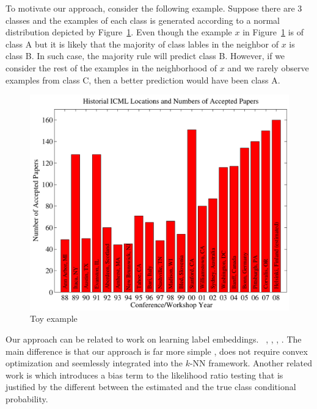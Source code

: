 \documentclass{article}
\begin{document}
To motivate our approach, consider the following example. Suppose
there are 3 classes and the examples of each class is generated
according to a normal distribution depicted by
Figure~\ref{fig:toy_example}. Even though the example $x$ in
Figure~\ref{fig:toy_example} is of class A but it is likely that the
majority of class lables in the neighbor of $x$ is class B. In such
case, the majority rule will predict class B. However, if we consider the rest
of the examples in the neighborhood of $x$ and we rarely observe
examples from class C, then a better prediction would have been class A.

\begin{figure}[ht]
\vskip 0.2in
\begin{center}
\centerline{\includegraphics[width=\columnwidth]{icml_numpapers}}
\caption{Toy example}
\label{fig:toy_example}
\end{center}
\vskip -0.2in
\end{figure} 

Our approach can be related to work on learning
label embeddings.~ \cite{Singh-Miller and Collins}, \cite{Dietterich
  Bakiri}, \cite{Allwien, Schapire, Singer}, \cite{Samy Bengio}. The
main difference is that our approach is far more simple , does not
require convex optimization and seemlessly integrated into the $k$-NN
framework. Another related work is \cite{Bilmes} which introduces a
bias term to the likelihood ratio testing that is justified by the
different between the estimated and the true class conditional
probability. 
\end{document}
